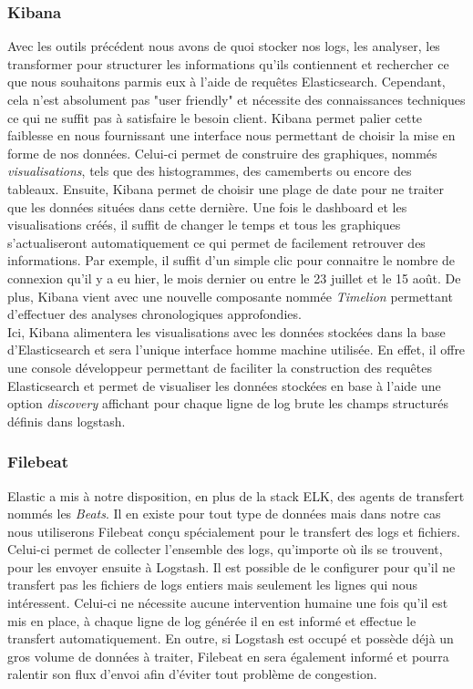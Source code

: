	\subsubsection{Kibana}
	Avec les outils précédent nous avons de quoi stocker nos logs, les analyser, les transformer pour structurer les informations qu'ils contiennent et rechercher ce que nous souhaitons parmis eux à l'aide de requêtes Elasticsearch. Cependant, cela n'est absolument pas "user friendly" et nécessite des connaissances techniques ce qui ne suffit pas à satisfaire le besoin client. Kibana permet palier cette faiblesse en nous fournissant une interface nous permettant de choisir la mise en forme de nos données. Celui-ci permet de construire des graphiques, nommés \textit{visualisations}, tels que des histogrammes, des camemberts ou encore des tableaux. Ensuite, Kibana permet de choisir une plage de date pour ne traiter que les données situées dans cette dernière. Une fois le dashboard et les visualisations créés, il suffit de changer le temps et tous les graphiques s'actualiseront automatiquement ce qui permet de facilement retrouver des informations. Par exemple, il suffit d'un simple clic pour connaitre le nombre de connexion qu'il y a eu hier, le mois dernier ou entre le 23 juillet et le 15 août. De plus, Kibana vient avec une nouvelle composante nommée \textit{Timelion} permettant d'effectuer des analyses chronologiques approfondies. \\
	
	Ici, Kibana alimentera les visualisations avec les données stockées dans la base d'Elasticsearch et sera l'unique interface homme machine utilisée. En effet, il offre une console développeur permettant de faciliter la construction des requêtes Elasticsearch et permet de visualiser les données stockées en base à l'aide une option \textit{discovery} affichant pour chaque ligne de log brute les champs structurés définis dans logstash.
	
	\subsubsection{Filebeat}	
	Elastic a mis à notre disposition, en plus de la stack ELK, des agents de transfert nommés les \textit{Beats}. Il en existe pour tout type de données mais dans notre cas nous utiliserons Filebeat conçu spécialement pour le transfert des logs et fichiers. Celui-ci permet de collecter l'ensemble des logs, qu'importe où ils se trouvent, pour les envoyer ensuite à Logstash. Il est possible de le configurer pour qu'il ne transfert pas les fichiers de logs entiers mais seulement les lignes qui nous intéressent. Celui-ci ne nécessite aucune intervention humaine une fois qu'il est mis en place, à chaque ligne de log générée il en est informé et effectue le transfert automatiquement. En outre, si Logstash est occupé et possède déjà un gros volume de données à traiter, Filebeat en sera également informé et pourra ralentir son flux d'envoi afin d'éviter tout problème de congestion.

